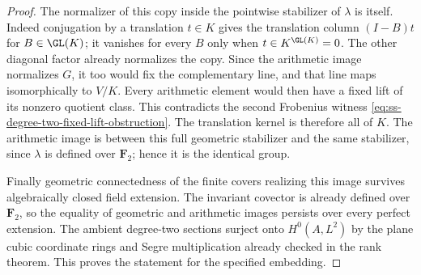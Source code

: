 \begin{proof}
The normalizer of this copy inside the pointwise stabilizer of $\lambda$
is itself. Indeed conjugation by a translation $t\in K$ gives the
translation column $(I-B)t$ for $B\in\GL(K)$; it vanishes for every $B$
only when $t\in K^{\GL(K)}=0$. The other diagonal factor already
normalizes the copy. Since the arithmetic image normalizes $G$, it too
would fix the complementary line, and that line maps isomorphically to
$V/K$. Every arithmetic element would then have a fixed lift of its
nonzero quotient class. This contradicts the second Frobenius witness
\eqref{eq:ss-degree-two-fixed-lift-obstruction}.
The translation kernel is therefore all of $K$.
The arithmetic image is between this full geometric stabilizer and the
same stabilizer, since $\lambda$ is defined over $\mathbf F_2$; hence it
is the identical group.

Finally geometric connectedness of the finite covers realizing this
image survives algebraically closed field extension. The invariant
covector is already defined over $\mathbf F_2$, so the equality of
geometric and arithmetic images persists over every perfect extension.
The ambient degree-two sections surject onto $H^0(A,L^2)$ by the plane
cubic coordinate rings and Segre multiplication already checked in the
rank theorem. This proves the statement for the specified embedding.
\end{proof}

